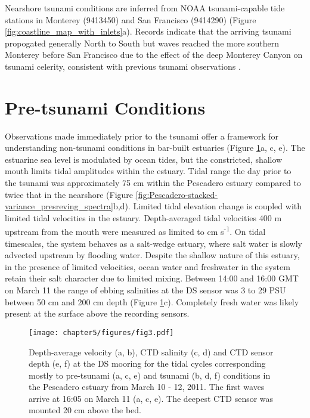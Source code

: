 Nearshore tsunami conditions are inferred from NOAA tsunami-capable
tide stations in Monterey (9413450) and San Francisco (9414290) (Figure
\ref{fig:coastline_map_with_inlets}a). Records indicate that the
arriving tsunami propogated generally North to South but waves reached
the more southern Monterey before San Francisco due to the effect
of the deep Monterey Canyon on tsunami celerity, consistent with previous
tsunami observations \parencite{gonzalez_edge_1995}. 


\section{Pre-tsunami Conditions}

Observations made immediately prior to the tsunami offer a framework
for understanding non-tsunami conditions in bar-built estuaries (Figure
\ref{fig:Station-DS-CTD_stack}a, c, e). The estuarine sea level is
modulated by ocean tides, but the constricted, shallow mouth limits
tidal amplitudes within the estuary. Tidal range the day prior to
the tsunami was approximately 75 cm within the Pescadero estuary compared
to twice that in the nearshore (Figure \ref{fig:Pescadero-stacked-variance_presreving_spectra}b,d).
Limited tidal elevation change is coupled with limited tidal velocities
in the estuary. Depth-averaged tidal velocities 400 m upstream from
the mouth were measured as limited to  cm s\textsuperscript{-1}.
On tidal timescales, the system behaves as a salt-wedge estuary, where
salt water is slowly advected upstream by flooding water. Despite
the shallow nature of this estuary, in the presence of limited velocities,
ocean water and freshwater in the system retain their salt character
due to limited mixing. Between 14:00 and 16:00 GMT on March 11 the
range of ebbing salinities at the DS sensor was 3 to 29 PSU between
50 cm and 200 cm depth (Figure \ref{fig:Station-DS-CTD_stack}c).
Completely fresh water was likely present at the surface above the
recording sensors. 



\begin{figure}
\texttt{[image: chapter5/figures/fig3.pdf]}

\protect\caption{Depth-average velocity (a, b), CTD salinity (c, d) and CTD sensor
depth (e, f) at the DS mooring for the tidal cycles corresponding
mostly to pre-tsunami (a, c, e) and tsunami (b, d, f) conditions in
the Pescadero estuary from March 10 - 12, 2011. The first waves arrive
at 16:05 on March 11 (a, c, e). The deepest CTD sensor was mounted
20 cm above the bed. \label{fig:Station-DS-CTD_stack}}
\end{figure}

